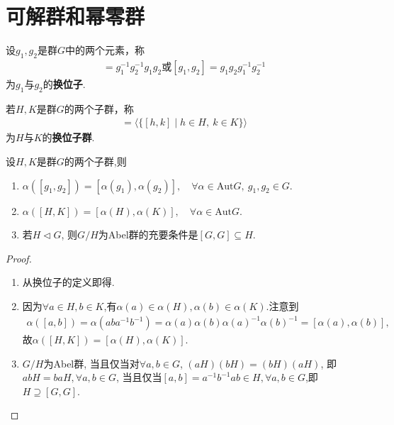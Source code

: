 \documentclass[../../main.tex]{subfiles}%
\begin{document}
\section{可解群和幂零群}

\begin{definition}[换位子]
设$g_1, g_2$是群$G$中的两个元素，称
\begin{align*}
[g_1, g_2] = g_1^{-1}g_2^{-1}g_1g_2\text{或}[g_1,g_2]=g_1g_2g_1^{-1}g_2^{-1}
\end{align*}
为$g_1$与$g_2$的\textbf{换位子}.
\end{definition}

\begin{definition}[换位子群]
若$H, K$是群$G$的两个子群，称
\begin{align*}
[H, K] = \langle \{[h, k] \mid h \in H,\ k \in K\} \rangle
\end{align*}
为$H$与$K$的\textbf{换位子群}.
\end{definition}

\begin{proposition}\label{proposition:换位子(群)保持群自同构}
设$H, K$是群$G$的两个子群,则
\begin{enumerate}[(1)]
\item\label{proposition:换位子(群)保持群自同构-1} $\alpha([g_1, g_2]) = [\alpha(g_1), \alpha(g_2)],\quad \forall \alpha \in \mathrm{Aut}G,\ g_1, g_2 \in G.$

\item\label{proposition:换位子(群)保持群自同构-2} $\alpha([H, K]) = [\alpha(H), \alpha(K)],\quad \forall \alpha \in \mathrm{Aut}G.$

\item\label{proposition:换位子(群)保持群自同构-3} 若$H\lhd G$, 则$G/H$为Abel群的充要条件是$[G,G]\subseteq H$.
\end{enumerate}
\end{proposition}
\begin{proof}
\begin{enumerate}[(1)]
\item 从换位子的定义即得.

\item 因为$\forall a\in H,b\in K$,有$\alpha(a)\in \alpha(H),\alpha(b)\in \alpha(K)$.注意到
\begin{align*}
\alpha([a,b])=\alpha(aba^{-1}b^{-1})=\alpha(a)\alpha(b)\alpha(a)^{-1}\alpha(b)^{-1}=[\alpha(a),\alpha(b)],
\end{align*}
故$\alpha([H,K])=[\alpha(H),\alpha(K)]$.

\item $G/H$为Abel群, 当且仅当对$\forall a,b\in G$, $(aH)(bH)=(bH)(aH)$, 即$abH=baH,\forall a,b\in G$, 当且仅当$[a,b]=a^{-1}b^{-1}ab\in H,\forall a,b\in G$,即$H\supseteq [G,G]$.
\end{enumerate}

\end{proof}
\end{document}
